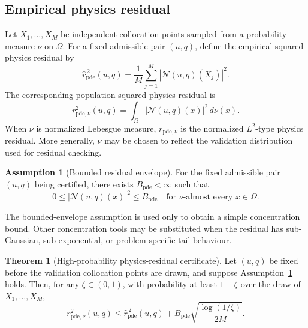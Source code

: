 \documentclass{article}
\numberwithin{equation}{section}
\theoremstyle{definition}
\newtheorem{assumption}{Assumption}
\newtheorem{theorem}{Theorem}
\begin{document}
\subsection{Empirical physics residual}

Let \(X_1,\dots,X_M\) be independent collocation points sampled from a probability measure \(\nu\) on \(\Omega\). For a fixed admissible pair \((u,q)\), define the empirical squared physics residual by
\begin{equation}
\widehat r_{\mathrm{pde}}^{\,2}(u,q)
=
\frac{1}{M}
\sum_{j=1}^{M}
\left|
\mathcal N(u,q)(X_j)
\right|^2 .
\label{eq:empirical-pde-residual}
\end{equation}
The corresponding population squared physics residual is
\begin{equation}
r_{\mathrm{pde},\nu}^{2}(u,q)
=
\int_{\Omega}
\left|
\mathcal N(u,q)(x)
\right|^2
\,d\nu(x).
\label{eq:population-pde-residual}
\end{equation}
When \(\nu\) is normalized Lebesgue measure, \(r_{\mathrm{pde},\nu}\) is the normalized \(L^2\)-type physics residual. More generally, \(\nu\) may be chosen to reflect the validation distribution used for residual checking.

\begin{assumption}[Bounded residual envelope]
\label{ass:bounded-residual}
For the fixed admissible pair \((u,q)\) being certified, there exists \(B_{\mathrm{pde}}<\infty\) such that
\begin{equation}
0
\le
\left|
\mathcal N(u,q)(x)
\right|^2
\le
B_{\mathrm{pde}}
\quad
\text{for \(\nu\)-almost every } x\in\Omega .
\label{eq:bounded-residual}
\end{equation}
\end{assumption}

The bounded-envelope assumption is used only to obtain a simple concentration bound. Other concentration tools may be substituted when the residual has sub-Gaussian, sub-exponential, or problem-specific tail behaviour.

\begin{theorem}[High-probability physics-residual certificate]
\label{thm:high-prob-residual}
Let \((u,q)\) be fixed before the validation collocation points are drawn, and suppose Assumption~\ref{ass:bounded-residual} holds. Then, for any \(\zeta\in(0,1)\), with probability at least \(1-\zeta\) over the draw of \(X_1,\dots,X_M\),
\begin{equation}
r_{\mathrm{pde},\nu}^{2}(u,q)
\le
\widehat r_{\mathrm{pde}}^{\,2}(u,q)
+
B_{\mathrm{pde}}
\sqrt{
	\frac{\log(1/\zeta)}{2M}
}.
\label{eq:high-prob-residual}
\end{equation}
\end{theorem}
\end{document}
